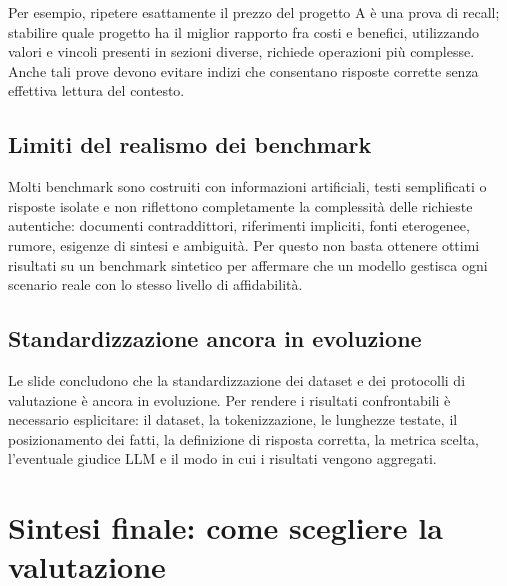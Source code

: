 Per esempio, ripetere esattamente il prezzo del progetto A è una prova di recall; stabilire quale progetto ha il miglior rapporto fra costi e benefici, utilizzando valori e vincoli presenti in sezioni diverse, richiede operazioni più complesse. Anche tali prove devono evitare indizi che consentano risposte corrette senza effettiva lettura del contesto.

\subsection{Limiti del realismo dei benchmark}

Molti benchmark sono costruiti con informazioni artificiali, testi semplificati o risposte isolate e non riflettono completamente la complessità delle richieste autentiche: documenti contraddittori, riferimenti impliciti, fonti eterogenee, rumore, esigenze di sintesi e ambiguità. Per questo non basta ottenere ottimi risultati su un benchmark sintetico per affermare che un modello gestisca ogni scenario reale con lo stesso livello di affidabilità.

\subsection{Standardizzazione ancora in evoluzione}

Le slide concludono che la standardizzazione dei dataset e dei protocolli di valutazione è ancora in evoluzione. Per rendere i risultati confrontabili è necessario esplicitare: il dataset, la tokenizzazione, le lunghezze testate, il posizionamento dei fatti, la definizione di risposta corretta, la metrica scelta, l'eventuale giudice LLM e il modo in cui i risultati vengono aggregati.

\section{Sintesi finale: come scegliere la valutazione}

